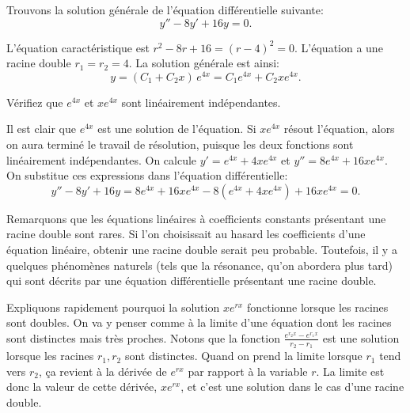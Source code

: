 \begin{example}
	Trouvons la solution générale de l'équation différentielle suivante:
	\begin{equation*}
		y'' -8 y' + 16 y = 0 .
	\end{equation*}
	
	L'équation caractéristique est $r^2 - 8 r + 16 = {(r-4)}^2 = 0$.
	L'équation a une racine double $r_1 = r_2 = 4$.  La solution générale est ainsi: 
	\begin{equation*}
		y = (C_1 + C_2 x)\, e^{4 x} = C_1 e^{4x} + C_2 x e^{4x} .
	\end{equation*}
	
	\begin{exercise}
		Vérifiez que  $e^{4x}$ et $x e^{4x}$ sont linéairement indépendantes. 
	\end{exercise}
	
	Il est clair que $e^{4x}$ est une solution de l'équation. Si $x e^{4x}$ résout l'équation, alors on aura terminé le travail de résolution, puisque les deux fonctions sont linéairement indépendantes. 
	On calcule $y' = e^{4x} + 4xe^{4x}$ et	$y'' = 8 e^{4x} + 16xe^{4x}$. 
	On substitue ces expressions dans l'équation différentielle: 
	\begin{equation*}
		y'' - 8 y' + 16 y = 8 e^{4x} + 16xe^{4x} - 8(e^{4x} + 4xe^{4x}) + 16 xe^{4x} = 	0 .
	\end{equation*}
\end{example}

Remarquons que les équations linéaires à coefficients constants présentant une racine double sont rares. 
Si l'on choisissait au hasard les coefficients d'une équation linéaire, obtenir une racine double serait peu probable. Toutefois, il y a quelques phénomènes naturels (tels que la résonance, qu'on abordera plus tard) qui sont décrits par une équation différentielle présentant une racine double.

Expliquons rapidement pourquoi la solution  $x e^{r x}$ fonctionne lorsque les racines sont doubles. 
On va y penser comme à la limite d'une équation dont les racines sont distinctes mais très proches.  
Notons que la fonction $\frac{e^{r_2 x} - e^{r_1 x}}{r_2 - r_1}$ est une solution lorsque 
les racines $r_1,r_2$ sont distinctes. Quand on prend la limite lorsque  $r_1$ tend vers $r_2$, 
ça revient à la dérivée de $e^{rx}$ par rapport à la variable $r$.  
La limite est donc la valeur de cette dérivée, 
$x e^{rx}$, et c'est une solution dans le cas d'une racine double.





